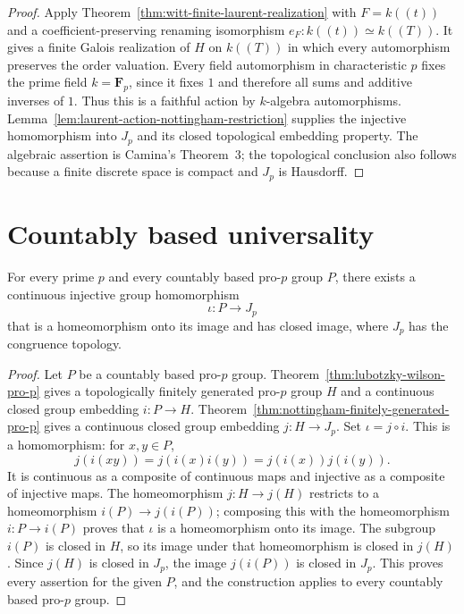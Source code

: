 \begin{proof}
Apply Theorem~\ref{thm:witt-finite-laurent-realization} with
$F=k((t))$ and a coefficient-preserving renaming isomorphism
$e_F:k((t))\simeq k((T))$. It gives a finite Galois realization
of $H$ on $k((T))$ in which every automorphism preserves the
order valuation. Every field automorphism in characteristic $p$
fixes the prime field $k=\mathbf F_p$, since it fixes $1$ and
therefore all sums and additive inverses of $1$.
Thus this is a faithful action by $k$-algebra automorphisms.
Lemma~\ref{lem:laurent-action-nottingham-restriction} supplies
the injective homomorphism into $J_p$ and its closed topological
embedding property.
The algebraic assertion is Camina's Theorem~3; the topological
conclusion also follows because a finite discrete space is
compact and $J_p$ is Hausdorff.
\end{proof}





\section{Countably based universality}

\begin{theorem}
\label{thm:camina-universality}
\leanok
For every prime $p$ and every countably based pro-$p$ group $P$,
there exists a continuous injective group homomorphism
\[
 \iota:P\longrightarrow J_p
\]
that is a homeomorphism onto its image and has closed image, where
$J_p$ has the congruence topology.
\end{theorem}

\begin{proof}
Let $P$ be a countably based pro-$p$ group.
Theorem~\ref{thm:lubotzky-wilson-pro-p} gives a topologically
finitely generated pro-$p$ group $H$ and a continuous closed
group embedding $i:P\to H$.
Theorem~\ref{thm:nottingham-finitely-generated-pro-p} gives a
continuous closed group embedding $j:H\to J_p$.
Set $\iota=j\circ i$. This is a homomorphism:
for $x,y\in P$,
\[
 j(i(xy))=j(i(x)i(y))=j(i(x))j(i(y)).
\]
It is continuous as a composite of continuous maps and injective
as a composite of injective maps. The homeomorphism $j:H\to j(H)$
restricts to a homeomorphism $i(P)\to j(i(P))$; composing this
with the homeomorphism $i:P\to i(P)$ proves that $\iota$ is a
homeomorphism onto its image.
The subgroup $i(P)$ is closed in $H$, so its image under that
homeomorphism is closed in $j(H)$. Since $j(H)$ is closed in $J_p$,
the image $j(i(P))$ is closed in $J_p$. This proves every assertion
for the given $P$, and the construction applies to every countably
based pro-$p$ group.
\end{proof}
